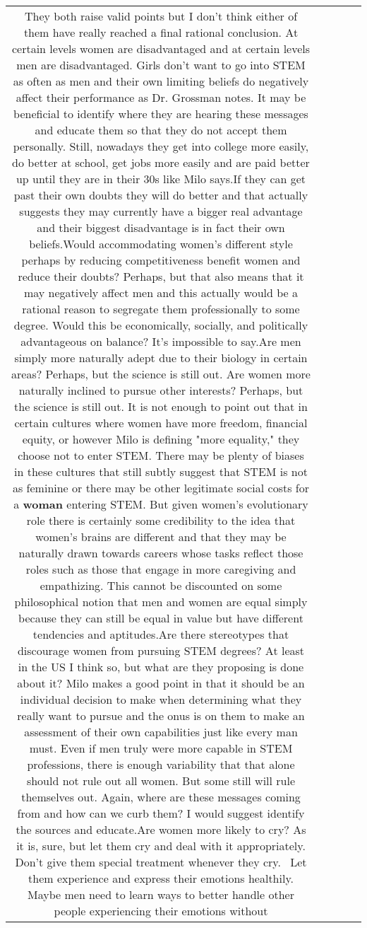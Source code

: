 \documentclass[11pt]{article}
\newlength\mylength
\begin{document}
\begin{center}
\begin{longtable}{|C{.65\mylength}|C{.30\mylength}|C{.12\mylength}|C{.12\mylength}|C{.12\mylength}|}
  \small They both raise valid points but I don't think either of them have really reached a final rational conclusion. At certain levels women are disadvantaged and at certain levels men are disadvantaged. Girls don't want to go into STEM as often as men and their own limiting beliefs do negatively affect their performance as Dr. Grossman notes. It may be beneficial to identify where they are hearing these messages and educate them so that they do not accept them personally. Still, nowadays they get into college more easily, do better at school, get jobs more easily and are paid better up until they are in their 30s like Milo says.If they can get past their own doubts they will do better and that actually suggests they may currently have a bigger real advantage and their biggest disadvantage is in fact their own beliefs.Would accommodating women's different style perhaps by reducing competitiveness benefit women and reduce their doubts? Perhaps, but that also means that it may negatively affect men and this actually would be a rational reason to segregate them professionally to some degree. Would this be economically, socially, and politically advantageous on balance? It's impossible to say.Are men simply more naturally adept due to their biology in certain areas? Perhaps, but the science is still out. Are women more naturally inclined to pursue other interests? Perhaps, but the science is still out. It is not enough to point out that in certain cultures where women have more freedom, financial equity, or however Milo is defining "more equality," they choose not to enter STEM. There may be plenty of biases in these cultures that still subtly suggest that STEM is not as feminine or there may be other legitimate social costs for a \textbf{woman} entering STEM. But given women's evolutionary role there is certainly some credibility to the idea that women's brains are different and that they may be naturally drawn towards careers whose tasks reflect those roles such as those that engage in more caregiving and empathizing. This cannot be discounted on some philosophical notion that men and women are equal simply because they can still be equal in value but have different tendencies and aptitudes.Are there stereotypes that discourage women from pursuing STEM degrees? At least in the US I think so, but what are they proposing is done about it? Milo makes a good point in that it should be an individual decision to make when determining what they really want to pursue and the onus is on them to make an assessment of their own capabilities just like every man must. Even if men truly were more capable in STEM professions, there is enough variability that that alone should not rule out all women. But some still will rule themselves out. Again, where are these messages coming from and how can we curb them? I would suggest identify the sources and educate.Are women more likely to cry? As it is, sure, but let them cry and deal with it appropriately. Don't give them special treatment whenever they cry.  Let them experience and express their emotions healthily. Maybe men need to learn ways to better handle other people experiencing their emotions without 
\end{longtable}
\end{center}
\end{document}
